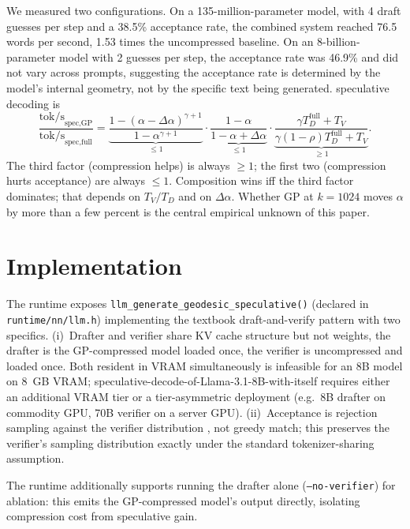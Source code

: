 \documentclass[11pt]{article}
\begin{document}
We measured two configurations. On a 135-million-parameter model, with 4
draft guesses per step and a 38.5\% acceptance rate, the combined system
reached 76.5 words per second, 1.53 times the uncompressed baseline. On an
8-billion-parameter model with 2 guesses per step, the acceptance rate was
46.9\% and did not vary across prompts, suggesting the acceptance rate is
determined by the model's internal geometry, not by the specific text being
generated.
speculative decoding is
\begin{equation}
\label{eq:netspeedup}
\frac{\text{tok/s}_\text{spec,GP}}{\text{tok/s}_\text{spec,full}}
=
\underbrace{\frac{1-(\alpha-\Delta\alpha)^{\gamma+1}}{1-\alpha^{\gamma+1}}}_{\leq 1}
\cdot
\underbrace{\frac{1-\alpha}{1-\alpha+\Delta\alpha}}_{\leq 1}
\cdot
\underbrace{\frac{\gamma T_D^\text{full}+T_V}{\gamma(1-\rho)T_D^\text{full}+T_V}}_{\geq 1}.
\end{equation}
The third factor (compression helps) is always $\geq 1$; the first two
(compression hurts acceptance) are always $\leq 1$.  Composition wins iff
the third factor dominates; that depends on $T_V/T_D$ and on $\Delta\alpha$.
Whether GP at $k{=}1024$ moves $\alpha$ by more than a few percent is the
central empirical unknown of this paper.

\section{Implementation}
The runtime exposes
\texttt{llm\_generate\_geodesic\_speculative()} (declared in
\texttt{runtime/nn/llm.h}) implementing the textbook draft-and-verify
pattern with two specifics.  (i)~Drafter and verifier share KV
cache structure but not weights, the drafter is the GP-compressed
model loaded once, the verifier is uncompressed and loaded once.  Both
resident in VRAM simultaneously is infeasible for an 8B model on 8~GB
VRAM; speculative-decode-of-Llama-3.1-8B-with-itself requires either an
additional VRAM tier or a tier-asymmetric deployment (e.g.\ 8B drafter
on commodity GPU, 70B verifier on a server GPU).  (ii)~Acceptance
is rejection sampling against the verifier distribution
\cite{leviathan2023speculative,chen2023speculative}, not greedy match;
this preserves the verifier's sampling distribution exactly under the
standard tokenizer-sharing assumption.

The runtime additionally supports running the drafter alone
(\texttt{--no-verifier}) for ablation: this emits the GP-compressed
model's output directly, isolating compression cost from speculative
gain.
\end{document}

